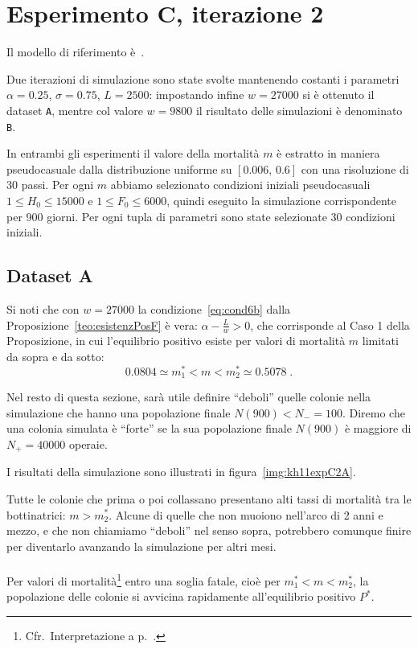 \section{Esperimento C, iterazione 2}
Il modello di riferimento è~\cite{khoury2011}.

Due iterazioni di simulazione sono state svolte mantenendo costanti i parametri $\alpha = 0.25$, $\sigma=0.75$,
$L=2500$: impostando infine $w=27000$ si è ottenuto il dataset \texttt{A}, mentre col valore
$w=9800$ il risultato delle simulazioni è denominato \texttt{B}.

In entrambi gli esperimenti il valore della mortalità $m$ è estratto in maniera pseudocasuale dalla distribuzione
uniforme su $[0.006, \, 0.6]$
con una risoluzione di 30 passi.
Per ogni $m$ abbiamo selezionato condizioni iniziali pseudocasuali $1 \leq H_0 \leq 15000$ e
$1 \leq F_0 \leq 6000$, quindi eseguito la simulazione corrispondente per 900 giorni.
Per ogni tupla di parametri sono state selezionate 30 condizioni iniziali.

\subsection{Dataset A}
\label{sec:kh11expC2A}
Si noti che con $w=27000$ la condizione~\eqref{eq:cond6b} dalla Proposizione~\ref{teo:esistenzPosF} è vera:
$\alpha - \frac{L}{w} > 0$, che corrisponde al Caso 1 della Proposizione,
in cui l'equilibrio positivo esiste per valori di mortalità $m$ limitati da sopra e da sotto:
$$ 0.0804 \simeq m_1^* < m < m_2^* \simeq 0.5078 \; .$$

Nel resto di questa sezione, sarà utile definire ``deboli'' quelle colonie nella simulazione che hanno
una popolazione finale $N(900) < N_- = 100$.
Diremo che una colonia simulata è ``forte'' se la sua popolazione finale $N(900)$
è maggiore di $N_+ = 40000$ operaie.

I risultati della simulazione sono illustrati in figura~\ref{img:kh11expC2A}.

Tutte le colonie che prima o poi collassano presentano alti tassi di mortalità tra le bottinatrici: $m > m_2^*$.
Alcune di quelle che non muoiono nell'arco di 2 anni e mezzo, e che non chiamiamo ``deboli'' nel senso sopra,
potrebbero comunque finire per diventarlo avanzando la simulazione per altri mesi.

\paragraph{}
Per valori di mortalità\footnote{Cfr.~Interpretazione a p.~\pageref{par:interpretationCond6b}.}
entro una soglia fatale, cioè per $m_1^* < m < m_2^*$,
la popolazione delle colonie si avvicina rapidamente all'equilibrio positivo $P^*$.


